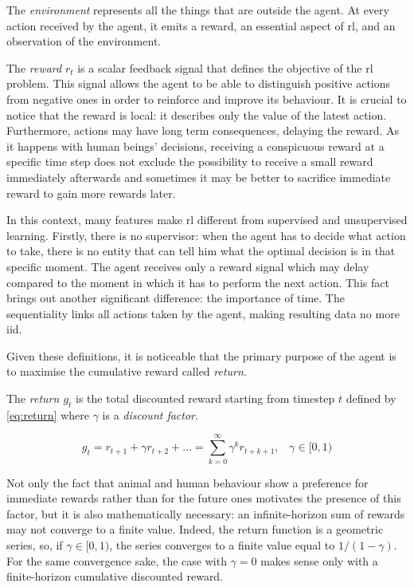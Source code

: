 The \textit{environment} represents all the things that are outside the agent. At every action received by the agent, it emits a reward, an essential aspect of \acrshort{rl}, and an observation of the environment.

The \textit{reward} $r_t$ is a scalar feedback signal that defines the objective of the \acrshort{rl} problem. This signal allows the agent to be able to distinguish positive actions from negative ones in order to reinforce and improve its behaviour. It is crucial to notice that the reward is local: it describes only the value of the latest action. Furthermore, actions may have long term consequences, delaying the reward. As it happens with human beings' decisions, receiving a conspicuous reward at a specific time step does not exclude the possibility to receive a small reward immediately afterwards and sometimes it may be better to sacrifice immediate reward to gain more rewards later.


In this context, many features make \acrshort{rl} different from supervised and unsupervised learning.
Firstly, there is no supervisor: when the agent has to decide what action to take, there is no entity that can tell him what the optimal decision is in that specific moment. The agent receives only a reward signal which may delay compared to the moment in which it has to perform the next action. 
This fact brings out another significant difference: the importance of time. The sequentiality links all actions taken by the agent, making resulting data no more \acrfull{iid}.

Given these definitions, it is noticeable that the primary purpose of the agent is to maximise the cumulative reward called \textit{return}.

The \textit{return $g_t$} is the total discounted reward starting from timestep $t$ defined by \vref{eq:return} where $\gamma$ is a \textit{discount factor}.

\begin{equation} \label{eq:return} 
	g_t = r_{t+1} + \gamma r_{t+2} + \dots = \sum_{k=0}^{\infty} \gamma^k r_{t+k+1}, \;\;\;\gamma \in [0,1)
\end{equation}

 Not only the fact that animal and human behaviour show a preference for immediate rewards rather than for the future ones motivates the presence of this factor, but it is also mathematically necessary: an infinite-horizon sum of rewards may not converge to a finite value. Indeed, the return function is a geometric series, so, if $\gamma \in [0,1)$, the series converges to a finite value equal to $1/(1-\gamma)$. For the same convergence sake, the case with $\gamma = 0$ makes sense only with a finite-horizon cumulative discounted reward.

